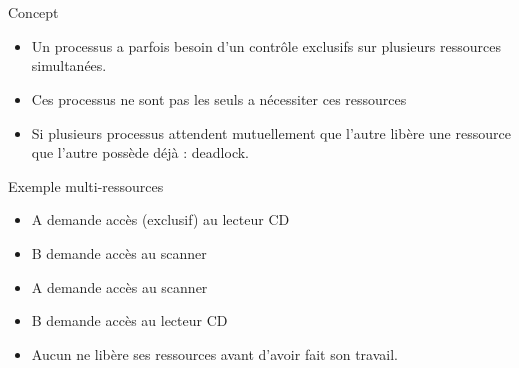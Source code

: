 \section{\sectitle}
\begin{frame}{\sectitle}
    \def\subsectitle{Concept}
    \begin{block}{\subsectitle}
        \begin{itemize}
            \item Un processus a parfois besoin d'un contrôle exclusifs sur
                plusieurs ressources simultanées.
            \item Ces processus ne sont pas les seuls a nécessiter ces
                ressources
            \item Si plusieurs processus attendent mutuellement que l'autre
                libère une ressource que l'autre possède déjà : deadlock.
        \end{itemize}
    \end{block}
    \def\subsectitle{Exemple multi-ressources}
    \begin{block}{\subsectitle}
        \begin{itemize}
            \item A demande accès (exclusif) au lecteur CD
            \item B demande accès au scanner
            \item A demande accès au scanner
            \item B demande accès au lecteur CD
            \item Aucun ne libère ses ressources avant d'avoir fait son travail.
        \end{itemize}
    \end{block}
\end{frame}

\def\sectitle{Deadlock}
